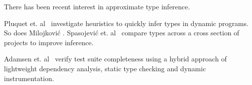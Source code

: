 There has been recent interest in approximate type inference.

Pluquet et. al~\cite{marot2009fast} investigate heuristics
to quickly infer types in dynamic programs.
So does Milojkovi{\'c}
\cite{milojkovic2016exploring}.
Spasojevi{\'c} et. al~\cite{spasojevic2014mining}
compare types across a cross section of projects to improve
inference.

Adamsen et. al~\cite{adamsen2016analyzing} verify test suite completeness using a hybrid approach of lightweight dependency analysis, static type checking and dynamic instrumentation.



